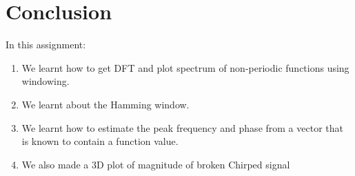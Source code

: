 \documentclass[11pt, a4paper]{article}
\begin{document}
\section{Conclusion}
In this assignment:
    \begin{enumerate}
    \item We learnt how to get DFT and plot spectrum of non-periodic functions using windowing.
    \item We learnt about the Hamming window.
    \item We learnt how to estimate the peak frequency and phase from a vector that is known to contain a function value.
    \item We also made a $3$D plot of magnitude of broken Chirped signal
    \end{enumerate}
\end{document}
